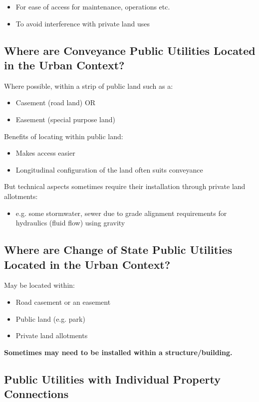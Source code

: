 \documentclass{report}
\begin{document}
	\begin{itemize}
		\item For ease of access for maintenance, operations etc.
		\item To avoid interference with private land uses
	\end{itemize}

	\subsection{Where are Conveyance Public Utilities Located in the Urban Context?}

	Where possible, within a strip of public land such as a:
	\begin{itemize}
		\item Casement (road land) OR
		\item Easement (special purpose land)
	\end{itemize}

	Benefits of locating within public land:
	\begin{itemize}
		\item Makes access easier
		\item Longitudinal configuration of the land often suits conveyance
	\end{itemize}

	But technical aspects sometimes require their installation through private land allotments:
	\begin{itemize}
		\item e.g. some stormwater, sewer due to grade alignment requirements for hydraulics (fluid flow) using gravity
	\end{itemize}

	\subsection{Where are Change of State Public Utilities Located in the Urban Context?}

	May be located within:
	\begin{itemize}
		\item Road casement or an easement
		\item Public land (e.g. park)
		\item Private land allotments
	\end{itemize}
	\textbf{Sometimes may need to be installed within a structure/building.}

	\subsection{Public Utilities with Individual Property Connections}
\end{document}

